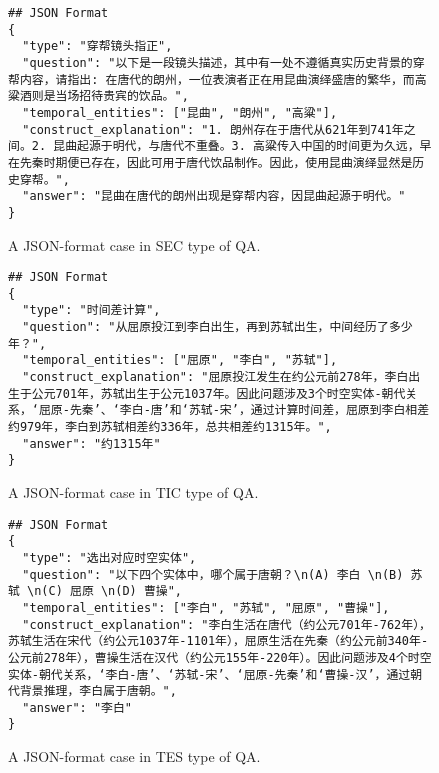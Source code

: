 \begin{figure}[t]
\begin{tcolorbox}[title={\textbf{\small Script Error Correction (SEC)}}, colback=whitesmoke, colframe=royalblue(web), boxrule=2pt, arc=0mm]
{\small
\begin{verbatim}
## JSON Format
{
  "type": "穿帮镜头指正",
  "question": "以下是一段镜头描述，其中有一处不遵循真实历史背景的穿帮内容，请指出: 在唐代的朗州，一位表演者正在用昆曲演绎盛唐的繁华，而高粱酒则是当场招待贵宾的饮品。",
  "temporal_entities": ["昆曲", "朗州", "高粱"],
  "construct_explanation": "1. 朗州存在于唐代从621年到741年之间。2. 昆曲起源于明代，与唐代不重叠。3. 高粱传入中国的时间更为久远，早在先秦时期便已存在，因此可用于唐代饮品制作。因此，使用昆曲演绎显然是历史穿帮。",
  "answer": "昆曲在唐代的朗州出现是穿帮内容，因昆曲起源于明代。"
}
\end{verbatim}
}
\end{tcolorbox}
\caption{A JSON-format case in SEC type of QA.}
\label{fig:SEC_case}
\end{figure}




\begin{figure}[H]
\begin{tcolorbox}[title={\textbf{\small Time Interval Calculation (TIC)}}, colback=whitesmoke, colframe=royalblue(web), boxrule=2pt, arc=0mm]
{\small
\begin{verbatim}
## JSON Format
{
  "type": "时间差计算",
  "question": "从屈原投江到李白出生，再到苏轼出生，中间经历了多少年？",
  "temporal_entities": ["屈原", "李白", "苏轼"],
  "construct_explanation": "屈原投江发生在约公元前278年，李白出生于公元701年，苏轼出生于公元1037年。因此问题涉及3个时空实体-朝代关系，‘屈原-先秦’、‘李白-唐’和‘苏轼-宋’，通过计算时间差，屈原到李白相差约979年，李白到苏轼相差约336年，总共相差约1315年。",
  "answer": "约1315年"
}
\end{verbatim}
}
\end{tcolorbox}
\caption{A JSON-format case in TIC type of QA.}
\label{fig:TIC_case}
\end{figure}



\begin{figure}[H]
\begin{tcolorbox}[title={\textbf{\small Temporal Entity Selection (TES)}}, colback=whitesmoke, colframe=royalblue(web), boxrule=2pt, arc=0mm]
{\small
\begin{verbatim}
## JSON Format
{
  "type": "选出对应时空实体",
  "question": "以下四个实体中，哪个属于唐朝？\n(A) 李白 \n(B) 苏轼 \n(C) 屈原 \n(D) 曹操",
  "temporal_entities": ["李白", "苏轼", "屈原", "曹操"],
  "construct_explanation": "李白生活在唐代（约公元701年-762年），苏轼生活在宋代（约公元1037年-1101年），屈原生活在先秦（约公元前340年-公元前278年），曹操生活在汉代（约公元155年-220年）。因此问题涉及4个时空实体-朝代关系，‘李白-唐’、‘苏轼-宋’、‘屈原-先秦’和‘曹操-汉’，通过朝代背景推理，李白属于唐朝。",
  "answer": "李白"
}
\end{verbatim}
}
\end{tcolorbox}
\caption{A JSON-format case in TES type of QA.}
\label{fig:TES_case}
\end{figure}



